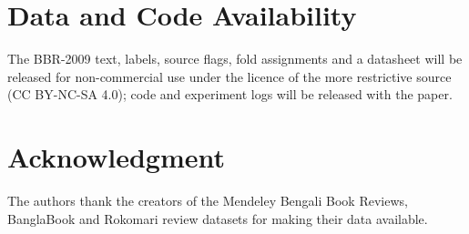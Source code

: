 \documentclass[journal]{IEEEtran}
\begin{document}
\section*{Data and Code Availability}
The BBR-2009 text, labels, source flags, fold assignments and a datasheet will be released for non-commercial use under the licence of the more restrictive source (CC BY-NC-SA 4.0); code and experiment logs will be released with the paper. %

\section*{Acknowledgment}
The authors thank the creators of the Mendeley Bengali Book Reviews, BanglaBook and Rokomari review datasets for making their data available.



\end{document}
